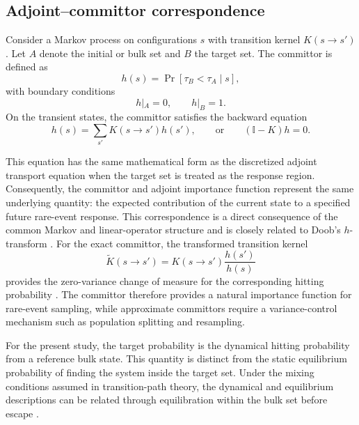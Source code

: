 \documentclass[a4paper,fleqn]{cas-sc}
\let\Oldsubsection\subsection
\renewcommand{\subsection}{\FloatBarrier\Oldsubsection}
\begin{document}
\subsection{Adjoint--committor correspondence}\label{sec:identity}

Consider a Markov process on configurations $s$ with transition kernel $K(s\rightarrow s')$. Let $A$ denote the initial or bulk set and $B$ the target set. The committor is defined as
\begin{equation}
h(s)=\Pr[\tau_B<\tau_A\mid s],
\end{equation}
with boundary conditions
\begin{equation}
h|_A=0,\qquad h|_B=1.
\end{equation}
On the transient states, the committor satisfies the backward equation
\begin{equation}
h(s)=\sum_{s'}K(s\rightarrow s')h(s'),
\qquad\text{or}\qquad
(\mathbb I-K)h=0 .
\label{eq:committor}
\end{equation}

This equation has the same mathematical form as the discretized adjoint transport equation when the target set is treated as the response region. Consequently, the committor and adjoint importance function represent the same underlying quantity: the expected contribution of the current state to a specified future rare-event response. This correspondence is a direct consequence of the common Markov and linear-operator structure and is closely related to Doob's $h$-transform \cite{doob1984}. For the exact committor, the transformed transition kernel
\begin{equation}
\widetilde K(s\rightarrow s')
=K(s\rightarrow s')\frac{h(s')}{h(s)}
\end{equation}
provides the zero-variance change of measure for the corresponding hitting probability \cite{chetrite2015,touchette2009}. The committor therefore provides a natural importance function for rare-event sampling, while approximate committors require a variance-control mechanism such as population splitting and resampling.

For the present study, the target probability is the dynamical hitting probability from a reference bulk state. This quantity is distinct from the static equilibrium probability of finding the system inside the target set. Under the mixing conditions assumed in transition-path theory, the dynamical and equilibrium descriptions can be related through equilibration within the bulk set before escape \cite{e2006}.
\end{document}
